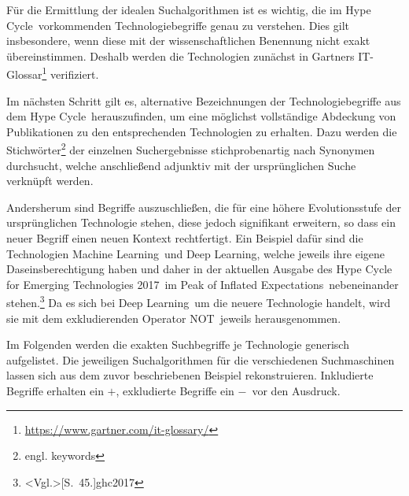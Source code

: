 Für die Ermittlung der idealen Suchalgorithmen ist es wichtig, die im \glqq Hype Cycle\grqq~vorkommenden Technologiebegriffe genau zu verstehen. Dies gilt insbesondere, wenn diese mit der wissenschaftlichen Benennung nicht exakt übereinstimmen. Deshalb werden die Technologien zunächst in Gartners IT-Glossar\footnote{\url{https://www.gartner.com/it-glossary/}} verifiziert.

Im nächsten Schritt gilt es, alternative Bezeichnungen der Technologiebegriffe aus dem \glqq Hype Cycle\grqq~herauszufinden, um eine möglichst vollständige Abdeckung von Publikationen zu den entsprechenden Technologien zu erhalten. Dazu werden die Stichwörter\footnote{engl. keywords} der einzelnen Suchergebnisse stichprobenartig nach Synonymen durchsucht, welche anschließend adjunktiv mit der ursprünglichen Suche verknüpft werden.

Andersherum sind Begriffe auszuschließen, die für eine höhere Evolutionsstufe der ursprünglichen Technologie stehen, diese jedoch signifikant erweitern, so dass ein neuer Begriff einen neuen Kontext rechtfertigt. Ein Beispiel dafür sind die Technologien \glqq Machine Learning\grqq~und \glqq Deep Learning\grqq, welche jeweils ihre eigene Daseinsberechtigung haben und daher in der aktuellen Ausgabe des \glqq Hype Cycle for Emerging Technologies 2017\grqq~im \glqq Peak of Inflated Expectations\grqq~nebeneinander stehen.\footnote{\citeNP<Vgl.>[S.~45.]{ghc2017}} Da es sich bei \glqq Deep Learning\grqq~um die neuere Technologie handelt, wird sie mit dem exkludierenden Operator \glqq NOT\grqq~jeweils herausgenommen.

Im Folgenden werden die exakten Suchbegriffe je Technologie generisch aufgelistet. Die jeweiligen Suchalgorithmen für die verschiedenen Suchmaschinen lassen sich aus dem zuvor beschriebenen Beispiel rekonstruieren. Inkludierte Begriffe erhalten ein \glqq $+$\grqq, exkludierte Begriffe ein \glqq $-$\grqq~vor den Ausdruck.

